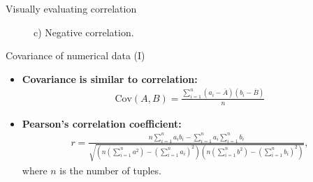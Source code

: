 \documentclass[aspectratio=169,t]{beamer}
\begin{document}
{\begin{frame}{Visually evaluating correlation}
\begin{figure}[H]
\begin{minipage}{0.32\textwidth}
            \caption{c) Negative correlation.}
        \end{minipage}\hfill
    \end{figure} 
    \end{frame}
  }

  { 
    \begin{frame}{Covariance of numerical data (I)}
    \begin{itemize}
      \item \textbf{\color{airforceblue}Covariance} \textbf{is similar to correlation:}\\
            \begin{align}
              \text{Cov}(A,B) = \frac{\sum_{i=1}^{n}(a_i-\overline{A})(b_i-\overline{B})}{n}
            \end{align}
      \item \textbf{Pearson's correlation coefficient:}\\
            \begin{align}
              r = \frac{n \sum_{i=1}^{n}a_ib_i - \sum_{i=1}^{n}a_i \sum_{i=1}^{n}b_i}{\sqrt{\left(n \left(\sum_{i=1}^{n} a^2\right) - \left(\sum_{i=1}^{n} a_i\right)^2\right) \left(n \left(\sum_{i=1}^{n}b^2\right) - \left(\sum_{i=1}^{n}b_i\right)^2\right)}},
            \end{align}
            where $n$ is the number of tuples.
    \end{itemize}
    \end{frame}
  }
\end{document}
